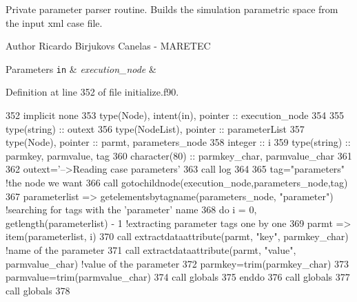 Private parameter parser routine. Builds the simulation parametric space from the input xml case file. 

\begin{DoxyAuthor}{Author}
Ricardo Birjukovs Canelas -\/ M\+A\+R\+E\+T\+EC
\end{DoxyAuthor}

\begin{DoxyParams}[1]{Parameters}
\mbox{\tt in}  & {\em execution\+\_\+node} & \\
\hline
\end{DoxyParams}


Definition at line 352 of file initialize.\+f90.


\begin{DoxyCode}
352     \textcolor{keywordtype}{implicit none}
353     \textcolor{keywordtype}{type}(Node), \textcolor{keywordtype}{intent(in)}, \textcolor{keywordtype}{pointer} :: execution\_node
354 
355     \textcolor{keywordtype}{type}(string) :: outext
356     \textcolor{keywordtype}{type}(NodeList), \textcolor{keywordtype}{pointer} :: parameterList
357     \textcolor{keywordtype}{type}(Node), \textcolor{keywordtype}{pointer} :: parmt, parameters\_node
358     \textcolor{keywordtype}{integer} :: i
359     \textcolor{keywordtype}{type}(string) :: parmkey, parmvalue, tag
360     \textcolor{keywordtype}{character(80)} :: parmkey\_char, parmvalue\_char
361 
362     outext=\textcolor{stringliteral}{'-->Reading case parameters'}
363     \textcolor{keyword}{call }log%
364 
365     tag=\textcolor{stringliteral}{"parameters"}    \textcolor{comment}{!the node we want}
366     \textcolor{keyword}{call }gotochildnode(execution\_node,parameters\_node,tag)
367     parameterlist => getelementsbytagname(parameters\_node, \textcolor{stringliteral}{"parameter"})       \textcolor{comment}{!searching for tags with the
       'parameter' name}
368     \textcolor{keywordflow}{do} i = 0, getlength(parameterlist) - 1                          \textcolor{comment}{!extracting parameter tags one by one}
369         parmt => item(parameterlist, i)
370         \textcolor{keyword}{call }extractdataattribute(parmt, \textcolor{stringliteral}{"key"}, parmkey\_char)       \textcolor{comment}{!name of the parameter}
371         \textcolor{keyword}{call }extractdataattribute(parmt, \textcolor{stringliteral}{"value"}, parmvalue\_char)   \textcolor{comment}{!value of the parameter}
372         parmkey=trim(parmkey\_char)
373         parmvalue=trim(parmvalue\_char)
374         \textcolor{keyword}{call }globals%
375 \textcolor{keywordflow}{    enddo}
376     \textcolor{keyword}{call }globals%
377     \textcolor{keyword}{call }globals%
378 
\end{DoxyCode}
